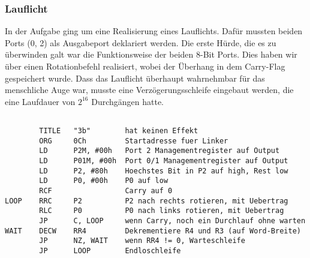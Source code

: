 \documentclass[a4paper,11pt]{article}
\begin{document}
\subsubsection{Lauflicht}
In der Aufgabe ging um eine Realisierung eines Lauflichts. 
Dafür mussten beiden Ports (0, 2) als Ausgabeport deklariert werden. Die erste Hürde, die es zu überwinden galt war die Funktionsweise der beiden 8-Bit Ports. 
Dies haben wir über einen Rotationbefehl realisiert, wobei der Überhang in dem Carry-Flag gespeichert wurde. 
Dass das Lauflicht überhaupt wahrnehmbar für das menschliche Auge war, musste eine Verzögerungsschleife eingebaut werden, die eine Laufdauer von $2^{16}$ Durchgängen hatte. 
\begin{lstlisting}

        TITLE   "3b"        hat keinen Effekt
        ORG     0Ch         Startadresse fuer Linker
        LD      P2M, #00h   Port 2 Managementregister auf Output
        LD      P01M, #00h  Port 0/1 Managementregister auf Output
        LD      P2, #80h    Hoechstes Bit in P2 auf high, Rest low
        LD      P0, #00h    P0 auf low
        RCF                 Carry auf 0
LOOP    RRC     P2          P2 nach rechts rotieren, mit Uebertrag
        RLC     P0          P0 nach links rotieren, mit Uebertrag
        JP      C, LOOP     wenn Carry, noch ein Durchlauf ohne warten
WAIT    DECW    RR4         Dekrementiere R4 und R3 (auf Word-Breite)
        JP      NZ, WAIT    wenn RR4 != 0, Warteschleife
        JP      LOOP        Endloschleife

\end{lstlisting}
\end{document}
